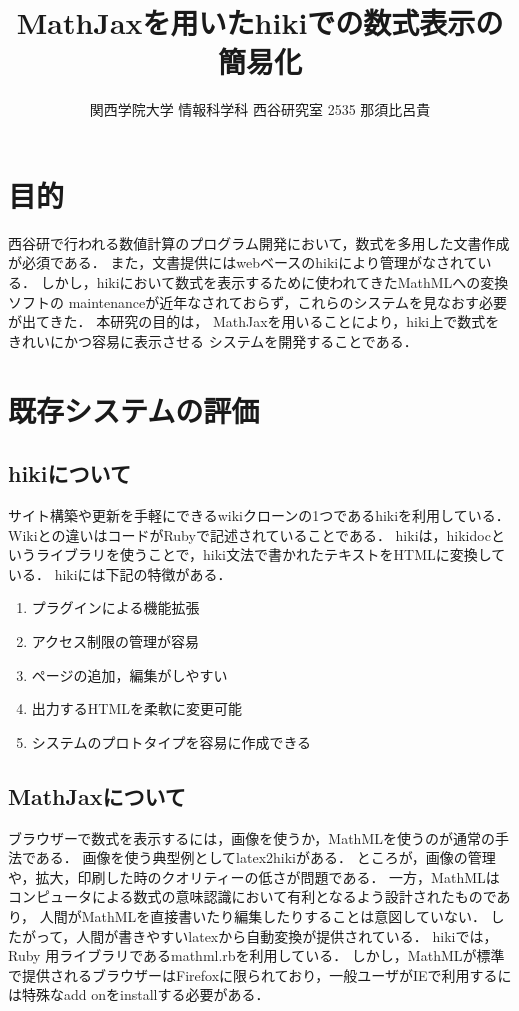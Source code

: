 \documentclass[10pt,a4j,twocolumn]{jsarticle}
\begin{document}
\title{MathJaxを用いたhikiでの数式表示の簡易化}
\author{関西学院大学 情報科学科 西谷研究室 2535 那須比呂貴}
\date{}
\maketitle
\section{目的}
西谷研で行われる数値計算のプログラム開発において，数式を多用した文書作成が必須である．
また，文書提供にはwebベースのhikiにより管理がなされている．
しかし，hikiにおいて数式を表示するために使われてきたMathMLへの変換ソフトの
maintenanceが近年なされておらず，これらのシステムを見なおす必要が出てきた．
本研究の目的は，
MathJaxを用いることにより，hiki上で数式をきれいにかつ容易に表示させる
システムを開発することである．

\section{既存システムの評価}
\subsection{hikiについて}
サイト構築や更新を手軽にできるwikiクローンの1つであるhikiを利用している．
Wikiとの違いはコードがRubyで記述されていることである．
hikiは，hikidocというライブラリを使うことで，hiki文法で書かれたテキストをHTMLに変換している．
hikiには下記の特徴がある．
\begin{enumerate}
\item プラグインによる機能拡張
\item アクセス制限の管理が容易
\item ページの追加，編集がしやすい
\item 出力するHTMLを柔軟に変更可能
\item システムのプロトタイプを容易に作成できる
\end{enumerate}
\subsection{MathJaxについて}
ブラウザーで数式を表示するには，画像を使うか，MathMLを使うのが通常の手法である．
画像を使う典型例としてlatex2hikiがある．
ところが，画像の管理や，拡大，印刷した時のクオリティーの低さが問題である．
一方，MathMLはコンピュータによる数式の意味認識において有利となるよう設計されたものであり，
人間がMathMLを直接書いたり編集したりすることは意図していない．
したがって，人間が書きやすいlatexから自動変換が提供されている．
hikiでは，Ruby 用ライブラリであるmathml.rbを利用している\cite{hiraku}．
しかし，MathMLが標準で提供されるブラウザーはFirefoxに限られており，一般ユーザがIEで利用するには特殊なadd onをinstallする必要がある．
\end{document}
